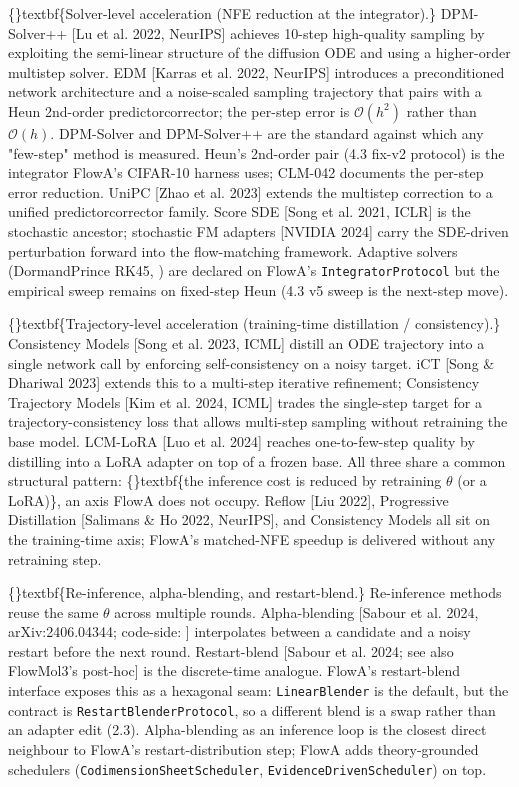 \documentclass{article}
\begin{document}
\{\}textbf\{Solver-level acceleration (NFE reduction at the integrator).\} DPM-Solver++ [Lu et al. 2022, NeurIPS] achieves 10-step high-quality sampling by exploiting the semi-linear structure of the diffusion ODE and using a higher-order multistep solver. EDM [Karras et al. 2022, NeurIPS] introduces a preconditioned network architecture and a noise-scaled sampling trajectory that pairs with a Heun 2nd-order predictorcorrector; the per-step error is $\mathcal{O}(h^2)$ rather than $\mathcal{O}(h)$. DPM-Solver and DPM-Solver++ are the standard against which any "few-step" method is measured. Heun's 2nd-order pair (4.3 fix-v2 protocol) is the integrator FlowA's CIFAR-10 harness uses; CLM-042 documents the per-step error reduction. UniPC [Zhao et al. 2023] extends the multistep correction to a unified predictorcorrector family. Score SDE [Song et al. 2021, ICLR] is the stochastic ancestor; stochastic FM adapters [NVIDIA 2024] carry the SDE-driven perturbation forward into the flow-matching framework. Adaptive solvers (DormandPrince RK45, ) are declared on FlowA's \texttt{IntegratorProtocol} but the empirical sweep remains on fixed-step Heun (4.3 v5 sweep is the next-step move).

\{\}textbf\{Trajectory-level acceleration (training-time distillation / consistency).\} Consistency Models [Song et al. 2023, ICML] distill an ODE trajectory into a single network call by enforcing self-consistency on a noisy target. iCT [Song \& Dhariwal 2023] extends this to a multi-step iterative refinement; Consistency Trajectory Models [Kim et al. 2024, ICML] trades the single-step target for a trajectory-consistency loss that allows multi-step sampling without retraining the base model. LCM-LoRA [Luo et al. 2024] reaches one-to-few-step quality by distilling into a LoRA adapter on top of a frozen base. All three share a common structural pattern: \{\}textbf\{the inference cost is reduced by retraining $\theta$ (or a LoRA)\}, an axis FlowA does not occupy. Reflow [Liu 2022], Progressive Distillation [Salimans \& Ho 2022, NeurIPS], and Consistency Models all sit on the training-time axis; FlowA's matched-NFE speedup is delivered without any retraining step.

\{\}textbf\{Re-inference, alpha-blending, and restart-blend.\} Re-inference methods reuse the same $\theta$ across multiple rounds. Alpha-blending [Sabour et al. 2024, arXiv:2406.04344; code-side: ] interpolates between a candidate and a noisy restart before the next round. Restart-blend [Sabour et al. 2024; see also FlowMol3's  post-hoc] is the discrete-time analogue. FlowA's restart-blend interface exposes this as a hexagonal seam: \texttt{LinearBlender} is the default, but the contract is \texttt{RestartBlenderProtocol}, so a different blend is a swap rather than an adapter edit (2.3). Alpha-blending as an inference loop is the closest direct neighbour to FlowA's restart-distribution step; FlowA adds theory-grounded schedulers (\texttt{CodimensionSheetScheduler}, \texttt{EvidenceDrivenScheduler}) on top.
\end{document}
